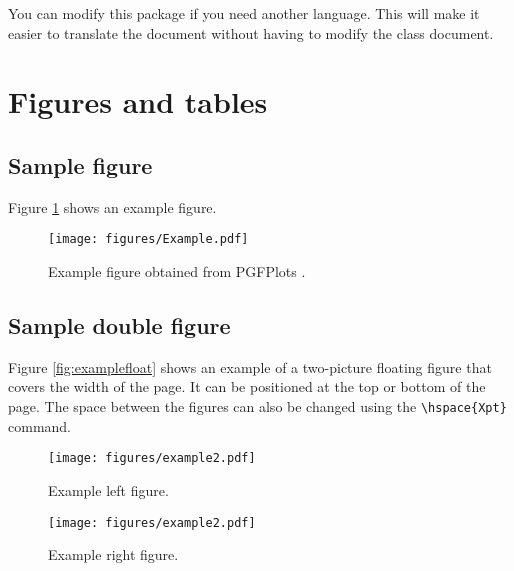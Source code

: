 \documentclass[9pt,a4paper,twoside]{rho-class/rho}
\begin{document}
        You can modify this package if you need another language. This will make it easier to translate the document without having to modify the class document.

\section{Figures and tables}

    \subsection{Sample figure}

        Figure \ref{fig:figure} shows an example figure.
        
            \begin{figure}[H]
                \centering
                \texttt{[image: figures/Example.pdf]}
                \caption{Example figure obtained from PGFPlots \cite{PFGPlots}.}
                \label{fig:figure}
            \end{figure}

    \subsection{Sample double figure}

        Figure \ref{fig:examplefloat} shows an example of a two-picture floating figure that covers the width of the page. It can be positioned at the top or bottom of the page. The space between the figures can also be changed using the \verb|\hspace{Xpt}| command.

        \begin{figure*}[t!] %
            \centering
                \begin{subfigure}[b]{0.38\linewidth} %
                    \texttt{[image: figures/example2.pdf]}
                    \caption{Example left figure.}
                    \label{fig:figa}
                \end{subfigure}
            \hspace{15pt}   %
                \begin{subfigure}[b]{0.38\linewidth} %
                    \centering
                    \texttt{[image: figures/example2.pdf]}
                    \caption{Example right figure.}
                    \label{fig:figb}
                \end{subfigure}
            \caption{Example figure that covers the width of the page obtained from PGFPlots \cite{PFGPlots}.}
            \label{fig:examplefloat}
        \end{figure*}
\end{document}
